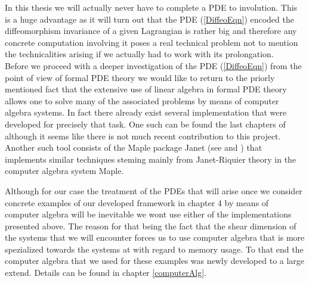 \documentclass[a4paper,12pt, DIV=14, BCOR=5mm, twoside, headsepline, numbers=noenddot]{scrbook}
\begin{document}
In this thesis we will actually never have to complete a PDE to involution. This is a huge advantage as it will turn out that the PDE (\ref{DiffeoEqn}) encoded the diffeomorphism invariance of a given Lagrangian is rather big and therefore any concrete computation involving it poses a real technical problem not to mention the technicalities arising if we actually had to work with its prolongation. \\

Before we proceed with a deeper investigation of the PDE (\ref{DiffeoEqn}) from the point of view of formal PDE theory we would like to return to the priorly mentioned fact that the extensive use of linear algebra in formal PDE theory allows one to solve many of the associated problems by means of computer algebra systems. In fact there already exist several implementation that were developed for precisely that task. One such can be found the last chapters of \cite{seiler1994analysis} although it seems like there is not much recent contribution to this project. Another such tool consists of the Maple package Janet (see \cite{Janet2} and \cite{Janet}) that implements similar techniques steming mainly from Janet-Riquier theory in the computer algebra system Maple. 

Although for our case the treatment of the PDEs that will arise once we consider concrete examples of our developed framework in chapter 4 by means of computer algebra will be inevitable we wont use either of the implementations presented above. The reason for that being the fact that the shear dimension of the systems that we will encounter forces us to use computer algebra that is more spezialized towards the systems at with regard to memory usage. To that end the computer algebra that we used for these examples was newly developed to a large extend. Details can be found in chapter \ref{computerAlg}.    
\end{document}
